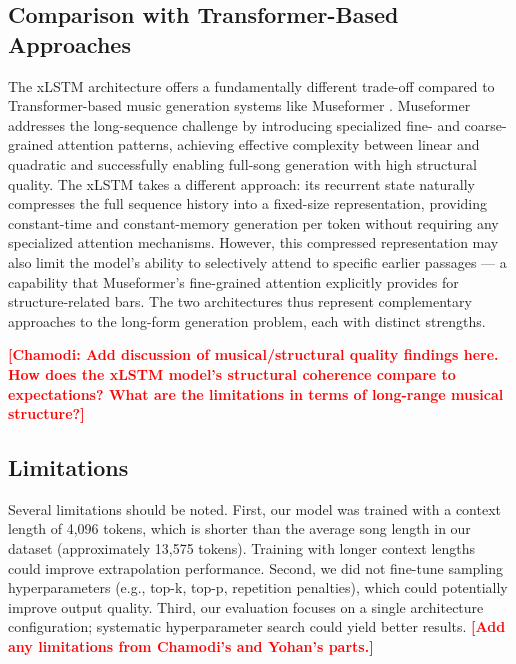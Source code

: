 \documentclass[conference]{IEEEtran}
\newcommand{\placeholder}[1]{\textcolor{red}{\textbf{[#1]}}}
\begin{document}
\subsection{Comparison with Transformer-Based Approaches}

The xLSTM architecture offers a fundamentally different trade-off compared to Transformer-based music generation systems like Museformer \cite{yu2022museformer}. Museformer addresses the long-sequence challenge by introducing specialized fine- and coarse-grained attention patterns, achieving effective complexity between linear and quadratic and successfully enabling full-song generation with high structural quality. The xLSTM takes a different approach: its recurrent state naturally compresses the full sequence history into a fixed-size representation, providing constant-time and constant-memory generation per token without requiring any specialized attention mechanisms. However, this compressed representation may also limit the model's ability to selectively attend to specific earlier passages --- a capability that Museformer's fine-grained attention explicitly provides for structure-related bars. The two architectures thus represent complementary approaches to the long-form generation problem, each with distinct strengths.

\placeholder{Chamodi: Add discussion of musical/structural quality findings here. How does the xLSTM model's structural coherence compare to expectations? What are the limitations in terms of long-range musical structure?}

\subsection{Limitations}

Several limitations should be noted. First, our model was trained with a context length of 4,096 tokens, which is shorter than the average song length in our dataset (approximately 13,575 tokens). Training with longer context lengths could improve extrapolation performance. Second, we did not fine-tune sampling hyperparameters (e.g., top-k, top-p, repetition penalties), which could potentially improve output quality. Third, our evaluation focuses on a single architecture configuration; systematic hyperparameter search could yield better results. \placeholder{Add any limitations from Chamodi's and Yohan's parts.}

\end{document}
